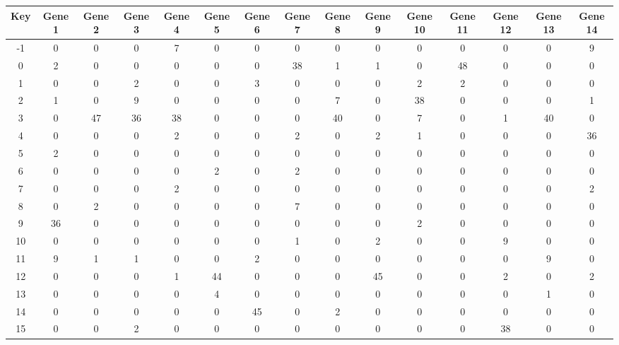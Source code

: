 \begin{tabular}{|c|c|c|c|c|c|c|c|c|c|c|c|c|c|c|}
\hline
Key & Gene 1 & Gene 2 & Gene 3 & Gene 4 & Gene 5 & Gene 6 & Gene 7 & Gene 8 & Gene 9 & Gene 10 & Gene 11 & Gene 12 & Gene 13 & Gene 14 \\
\hline
-1 & 0 & 0 & 0 & 7 & 0 & 0 & 0 & 0 & 0 & 0 & 0 & 0 & 0 & 9 \\
0 & 2 & 0 & 0 & 0 & 0 & 0 & 38 & 1 & 1 & 0 & 48 & 0 & 0 & 0 \\
1 & 0 & 0 & 2 & 0 & 0 & 3 & 0 & 0 & 0 & 2 & 2 & 0 & 0 & 0 \\
2 & 1 & 0 & 9 & 0 & 0 & 0 & 0 & 7 & 0 & 38 & 0 & 0 & 0 & 1 \\
3 & 0 & 47 & 36 & 38 & 0 & 0 & 0 & 40 & 0 & 7 & 0 & 1 & 40 & 0 \\
4 & 0 & 0 & 0 & 2 & 0 & 0 & 2 & 0 & 2 & 1 & 0 & 0 & 0 & 36 \\
5 & 2 & 0 & 0 & 0 & 0 & 0 & 0 & 0 & 0 & 0 & 0 & 0 & 0 & 0 \\
6 & 0 & 0 & 0 & 0 & 2 & 0 & 2 & 0 & 0 & 0 & 0 & 0 & 0 & 0 \\
7 & 0 & 0 & 0 & 2 & 0 & 0 & 0 & 0 & 0 & 0 & 0 & 0 & 0 & 2 \\
8 & 0 & 2 & 0 & 0 & 0 & 0 & 7 & 0 & 0 & 0 & 0 & 0 & 0 & 0 \\
9 & 36 & 0 & 0 & 0 & 0 & 0 & 0 & 0 & 0 & 2 & 0 & 0 & 0 & 0 \\
10 & 0 & 0 & 0 & 0 & 0 & 0 & 1 & 0 & 2 & 0 & 0 & 9 & 0 & 0 \\
11 & 9 & 1 & 1 & 0 & 0 & 2 & 0 & 0 & 0 & 0 & 0 & 0 & 9 & 0 \\
12 & 0 & 0 & 0 & 1 & 44 & 0 & 0 & 0 & 45 & 0 & 0 & 2 & 0 & 2 \\
13 & 0 & 0 & 0 & 0 & 4 & 0 & 0 & 0 & 0 & 0 & 0 & 0 & 1 & 0 \\
14 & 0 & 0 & 0 & 0 & 0 & 45 & 0 & 2 & 0 & 0 & 0 & 0 & 0 & 0 \\
15 & 0 & 0 & 2 & 0 & 0 & 0 & 0 & 0 & 0 & 0 & 0 & 38 & 0 & 0 \\
\hline
\end{tabular}
